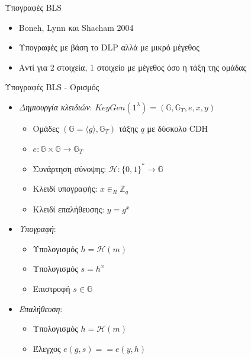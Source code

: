 \documentclass[handout]{beamer}
\begin{document}
\begin{frame}{Υπογραφές BLS}
	\begin{itemize}
		\item Boneh, Lynn και Shacham 2004
		\item Υπογραφές με βάση το DLP αλλά με μικρό μέγεθος
		\item Αντί για 2 στοιχεία, 1 στοιχείο με μέγεθος όσο η τάξη της ομάδας
	\end{itemize}
\end{frame}

\begin{frame}{Υπογραφές BLS - Ορισμός}
	\begin{itemize}
		\item \emph{Δημιουργία κλειδιών}: 
		$KeyGen(1^\lambda) = (\mathbb{G},\mathbb{G}_T, e, x, y)$ \pause
		\begin{itemize}
			\item Ομάδες $(\mathbb{G} = \langle g \rangle,\mathbb{G}_T)$ τάξης $q$ με δύσκολο CDH \pause
			\item $e: \mathbb{G} \times \mathbb{G} \rightarrow \mathbb{G}_T$ \pause
			\item Συνάρτηση σύνοψης: $\mathcal{H}:\{0,1\}^* \rightarrow \mathbb{G}$ \pause
			\item Κλειδί υπογραφής: $x \in_R \mathbb{Z}_q$ \pause
			\item Κλειδί επαλήθευσης: $y = g^x$
		\end{itemize}
		\item \emph{Υπογραφή}: 
		\begin{itemize}
			\item Υπολογισμός $h=\mathcal{H}(m)$ \pause
			\item Υπολογισμός $s = h^x$ \pause
			\item Επιστροφή $s \in \mathbb{G}$ 
		\end{itemize}
		\item \emph{Επαλήθευση}: 
		\begin{itemize}
			\item Υπολογισμός $h=\mathcal{H}(m)$ \pause
			\item Έλεγχος $e(g,s)==e(y,h)$
		\end{itemize}
	\end{itemize}	
\end{frame}
\end{document}
